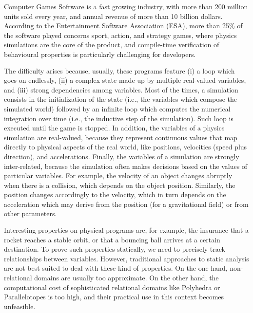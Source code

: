 Computer Games Software is a fast growing industry, with more than 200 million units sold every year, and annual revenue of more than 10 billion dollars. According to the Entertainment Software Association (ESA), more than 25\% of the software played concerns sport, action, and strategy games, where physics simulations are the core of the product, and compile-time verification of behavioural properties is particularly challenging for developers. 

The difficulty arises because, usually, these programs feature (i) a  loop which goes on endlessly, (ii) a complex state made up by multiple real-valued variables, and (iii) strong dependencies among variables. 
Most of the times, a simulation consists in the initialization of the state (i.e., the variables which compose the simulated world) followed by an infinite  loop which computes the numerical integration over time (i.e., the inductive step of the simulation). Such loop is executed until the game is stopped.
In addition, the variables of a physics simulation are real-valued, because they represent continuous values that map directly to physical aspects of the real world, like positions, velocities (speed plus direction), and accelerations. 
Finally, the variables of a simulation are strongly inter-related, because the simulation often makes decisions based on the values of particular variables. For example, the velocity of an object changes abruptly when there is a collision, which depends on the object position. Similarly, the position changes accordingly to the velocity, which in turn depends on the acceleration which may derive from the position (for a gravitational field) or from other parameters. 

Interesting properties on physical programs are, for example, the insurance that a rocket reaches a stable orbit, or that a bouncing ball arrives at a certain destination. To prove such properties statically, we need to precisely track relationships between variables. However, traditional approaches to static analysis are not best suited to deal with these kind of properties. On the one hand, non-relational domains 
are usually too approximate. On the other hand, the computational cost of sophisticated relational domains like Polyhedra \cite{CH78} or Parallelotopes \cite{AS12} is too high, and their practical use in this context becomes unfeasible.   

